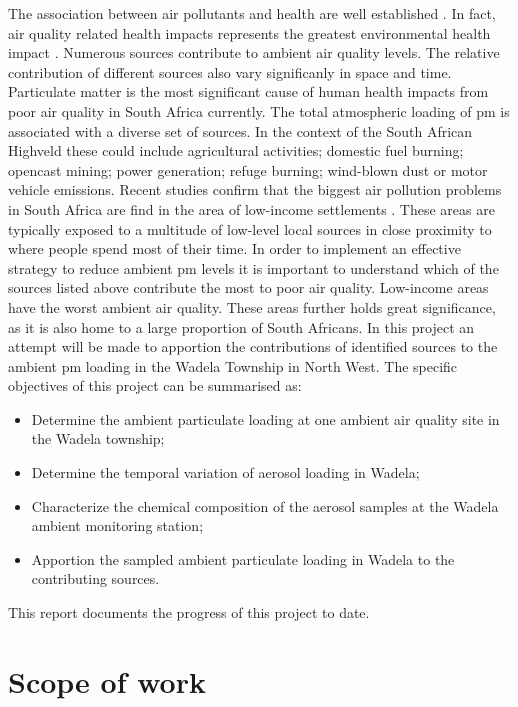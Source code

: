 \documentclass{nwureport}
\begin{document}
The association between air pollutants and health are well established \citep{Dockery1993,Pope2002}. In fact, air quality related health impacts represents the greatest environmental health impact \citep{Lim2012}. Numerous sources contribute to ambient air quality levels. The relative contribution of different sources also vary significanly in space and time. Particulate matter is the most significant cause of human health impacts from poor air quality in South Africa currently. The total atmospheric loading of \gls{pm} is associated with a diverse set of sources. In the context of the South African Highveld these could include agricultural activities; domestic fuel burning; opencast mining; power generation; refuge burning; wind-blown dust or motor vehicle emissions. Recent studies confirm that the biggest air pollution problems in South Africa are find in the area of low-income settlements \citep{Hersey2015}. These areas are typically exposed to a multitude of low-level local sources in close proximity to where people spend most of their time. In order to implement an effective strategy to reduce ambient \gls{pm} levels it is important to understand which of the sources listed above contribute the most to poor air quality. Low-income areas have the worst ambient air quality. These areas further holds great significance, as it is also home to a large proportion of South Africans. In this project an attempt will be made to apportion the contributions of identified sources to the ambient \gls{pm} loading in the Wadela Township in North West. The specific objectives of this project can be summarised as:

\begin{itemize}
\item Determine the ambient particulate loading at one ambient air quality site in the Wadela township;
\item Determine the temporal variation of aerosol loading in Wadela;
\item Characterize the chemical composition of the aerosol samples at the Wadela ambient monitoring station;
\item Apportion the sampled ambient particulate loading in Wadela to the contributing sources.
\end{itemize}

This report documents the progress of this project to date.

\section{Scope of work}
\end{document}
